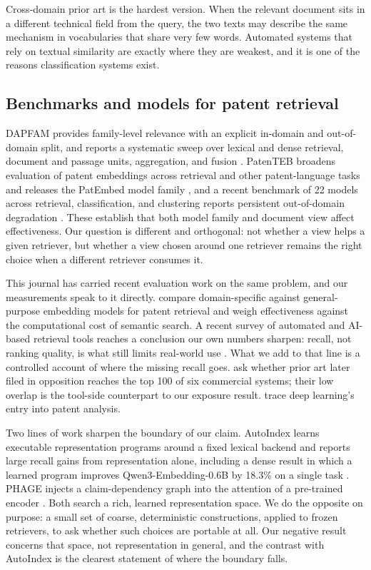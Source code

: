 \documentclass[preprint,11pt,authoryear]{elsarticle}          %
\begin{document}
Cross-domain prior art is the hardest version. When the relevant document sits in a different technical field from the query, the two texts may describe the same mechanism in vocabularies that share very few words. Automated systems that rely on textual similarity are exactly where they are weakest, and it is one of the reasons classification systems exist.

\subsection{Benchmarks and models for patent retrieval}

DAPFAM provides family-level relevance with an explicit in-domain and out-of-domain split, and reports a systematic sweep over lexical and dense retrieval, document and passage units, aggregation, and fusion \citep{ayaou2026dapfam}. PatenTEB broadens evaluation of patent embeddings across retrieval and other patent-language tasks and releases the PatEmbed model family \citep{ayaou2025patenteb}, and a recent benchmark of 22 models across retrieval, classification, and clustering reports persistent out-of-domain degradation \citep{yousefiramandi2026patent}. These establish that both model family and document view affect effectiveness. Our question is different and orthogonal: not whether a view helps a given retriever, but whether a view chosen around one retriever remains the right choice when a different retriever consumes it.

This journal has carried recent evaluation work on the same problem, and our
measurements speak to it directly. \citet{chikkamath2026rethinking} compare
domain-specific against general-purpose embedding models for patent retrieval
and weigh effectiveness against the computational cost of semantic search. A
recent survey of automated and AI-based retrieval tools reaches a conclusion
our own numbers sharpen: recall, not ranking quality, is what still limits
real-world use \citep{poce2026survey}. What we add to that line is a controlled
account of where the missing recall goes. \citet{rees2025evaluating} ask
whether prior art later filed in opposition reaches the top 100 of six
commercial systems; their low overlap is the tool-side counterpart to our
exposure result. \citet{krestel2021survey} trace deep learning's entry into
patent analysis.

Two lines of work sharpen the boundary of our claim. AutoIndex learns executable representation programs around a fixed lexical backend and reports large recall gains from representation alone, including a dense result in which a learned program improves Qwen3-Embedding-0.6B by 18.3\% on a single task \citep{onuallain2026autoindex}. PHAGE injects a claim-dependency graph into the attention of a pre-trained encoder \citep{phage2026}. Both search a rich, learned representation space. We do the opposite on purpose: a small set of coarse, deterministic constructions, applied to frozen retrievers, to ask whether such choices are portable at all. Our negative result concerns that space, not representation in general, and the contrast with AutoIndex is the clearest statement of where the boundary falls.
\end{document}
